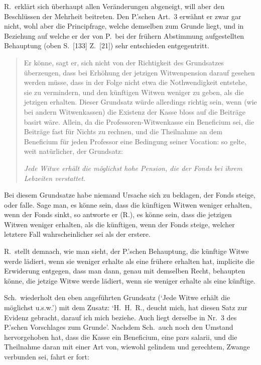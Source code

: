\documentclass[12pt,a4paper]{article}
\begin{document}
R.\ erkl\"art sich \"uberhaupt allen Ver\"anderungen abgeneigt, will aber den Beschl\"ussen der Mehrheit beitreten. Den P.'schen Art.\ 3 erw\"ahnt er zwar gar nicht, wohl aber die Principfrage, welche demselben zum Grunde liegt, und in Beziehung auf welche er der von P.\ bei der fr\"uhern Abstimmung aufgestellten Behauptung (oben S.\ [133] Z.\ [21]) sehr entschieden entgegentritt.

\begin{quote}
Er k\"onne, sagt er, sich nicht von der Richtigkeit des Grundsatzes \"uberzeugen, dass bei Erh\"ohung der jetzigen Witwenpension darauf gesehen werden m\"usse, dass in der Folge nicht etwa die Nothwendigkeit entstehe, sie zu vermindern, und den k\"unftigen Witwen weniger zu geben, als die jetzigen erhalten. Dieser Grundsatz w\"urde allerdings richtig sein, wenn (wie bei andern Witwenkassen) die Existenz der Kasse bloss auf die Beitr\"age basirt w\"are. Allein, da die Professoren-Witwenkasse ein Beneficium sei, die Beitr\"age fast f\"ur Nichts zu rechnen, und die Theilnahme an dem Beneficium f\"ur jeden Professor eine Bedingung seiner Vocation: so gelte, weit nat\"urlicher, der Grundsatz:

\textit{Jede Witwe erh\"alt die m\"oglichst hohe Pension, die der Fonds bei ihrem Lebzeiten verstattet.}
\end{quote}

Bei diesem Grundsatze habe niemand Ursache sich zu beklagen, der Fonds steige, oder falle. Sage man, es k\"onne sein, dass die k\"unftigen Witwen weniger erhalten, wenn der Fonds sinkt, so antworte er (R.), es k\"onne sein, dass die jetzigen Witwen weniger erhalten, als die k\"unftigen, wenn der Fonds steige, welcher letztere Fall wahrscheinlicher sei als der erstere.

R.\ stellt demnach, wie man sieht, der P.'schen Behauptung, die k\"unftige Witwe werde l\"adiert, wenn sie weniger erhalte als eine fr\"uhere erhalten hat, implicite die Erwiderung entgegen, dass man dann, genau mit demselben Recht, behaupten k\"onne, die jetzige Witwe werde l\"adiert, wenn sie weniger erhalte als eine k\"unftige.

Sch.\ wiederholt den eben angef\"uhrten Grundsatz (`Jede Witwe erh\"alt die m\"oglichst u.s.w.') mit dem Zusatz: `H.\ H.\ R., deucht mich, hat diesen Satz zur Evidenz gebracht, darauf ich mich beziehe. Auch liegt derselbe in Nr.\ 3 des P.'schen Vorschlages zum Grunde'. Nachdem Sch.\ auch noch den Umstand hervorgehoben hat, dass die Kasse ein Beneficium, eine pars salarii, und die Theilnahme daran mit einer Art von, wiewohl gelindem und gerechtem, Zwange verbunden sei, fahrt er fort:
\end{document}
